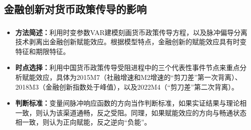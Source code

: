 \documentclass[12pt,aspectratio=169]{ctexbeamer}
\begin{document}
			\subsection{金融创新对货币政策传导的影响}
			\begin{frame}
				\frametitle{}
				\begin{itemize}
					\justifying
					\normalsize
					\item \textbf{方法简述：}利用时变参数VAR建模刻画货币政策传导方程，以及脉冲偏导分离技术剥离出金融创新赋能效应。根据模型特点，金融创新的赋能效应具有时变特征和期限特征。
					\item \textbf{时点选择：}利用中国货币政策传导受阻进程中的三个代表性事件节点来重点分析赋能效应，具体为2015M7（社融增速和M2增速的“剪刀差”第一次背离）、2018M3（金融创新指数处于峰值），以及2022M4（“剪刀差”第二次背离）。
					\item \textbf{判断标准：}变量间脉冲响应函数的方向当作判断标准，如果实证结果与理论相一致，则认为该渠道通畅，反之受阻。同理，如果赋能效应的方向与畅通状态相一致，则认为正向赋能，反之逆向“负能”。
				\end{itemize}
			\end{frame}
\end{document}
